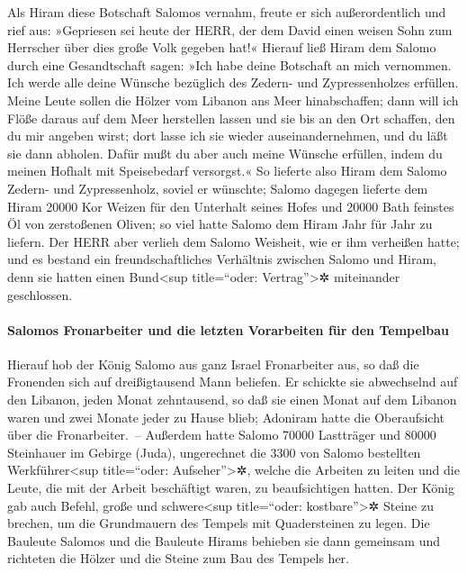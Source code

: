 Als Hiram diese Botschaft Salomos vernahm, freute er sich
außerordentlich und rief aus: »Gepriesen sei heute der HERR, der dem
David einen weisen Sohn zum Herrscher über dies große Volk gegeben hat!«
Hierauf ließ Hiram dem Salomo durch eine Gesandtschaft
sagen: »Ich habe deine Botschaft an mich vernommen. Ich werde alle deine
Wünsche bezüglich des Zedern- und Zypressenholzes erfüllen.
Meine Leute sollen die Hölzer vom Libanon ans Meer
hinabschaffen; dann will ich Flöße daraus auf dem Meer herstellen lassen
und sie bis an den Ort schaffen, den du mir angeben wirst; dort lasse
ich sie wieder auseinandernehmen, und du läßt sie dann abholen. Dafür
mußt du aber auch meine Wünsche erfüllen, indem du meinen Hofhalt mit
Speisebedarf versorgst.« So lieferte also Hiram dem
Salomo Zedern- und Zypressenholz, soviel er wünschte;
Salomo dagegen lieferte dem Hiram 20000 Kor Weizen für
den Unterhalt seines Hofes und 20000 Bath feinstes Öl von zerstoßenen
Oliven; so viel hatte Salomo dem Hiram Jahr für Jahr zu liefern.
Der HERR aber verlieh dem Salomo Weisheit, wie er ihm
verheißen hatte; und es bestand ein freundschaftliches Verhältnis
zwischen Salomo und Hiram, denn sie hatten einen Bund\textless sup
title=``oder: Vertrag''\textgreater✲ miteinander geschlossen.

\hypertarget{salomos-fronarbeiter-und-die-letzten-vorarbeiten-fuxfcr-den-tempelbau}{%
\paragraph{Salomos Fronarbeiter und die letzten Vorarbeiten für den
Tempelbau}\label{salomos-fronarbeiter-und-die-letzten-vorarbeiten-fuxfcr-den-tempelbau}}

Hierauf hob der König Salomo aus ganz Israel Fronarbeiter
aus, so daß die Fronenden sich auf dreißigtausend Mann beliefen.
Er schickte sie abwechselnd auf den Libanon, jeden Monat
zehntausend, so daß sie einen Monat auf dem Libanon waren und zwei
Monate jeder zu Hause blieb; Adoniram hatte die Oberaufsicht über die
Fronarbeiter.~-- Außerdem hatte Salomo 70000 Lastträger
und 80000 Steinhauer im Gebirge (Juda), ungerechnet die
3300 von Salomo bestellten Werkführer\textless sup title=``oder:
Aufseher''\textgreater✲, welche die Arbeiten zu leiten und die Leute,
die mit der Arbeit beschäftigt waren, zu beaufsichtigen hatten.
Der König gab auch Befehl, große und schwere\textless sup
title=``oder: kostbare''\textgreater✲ Steine zu brechen, um die
Grundmauern des Tempels mit Quadersteinen zu legen. Die
Bauleute Salomos und die Bauleute Hirams behieben sie dann gemeinsam und
richteten die Hölzer und die Steine zum Bau des Tempels her.

